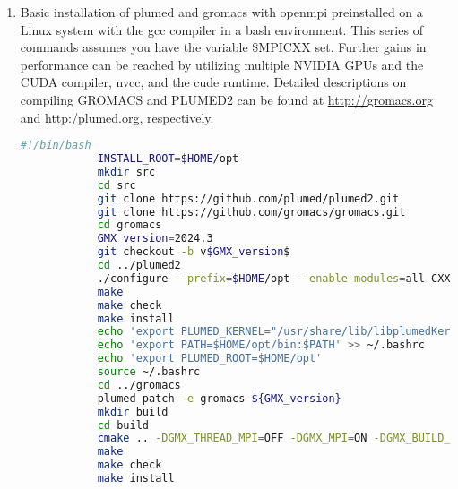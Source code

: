 \begin{enumerate}
\item Basic installation of plumed and gromacs with openmpi preinstalled on a Linux system with the gcc compiler in a bash environment. 
This series of commands assumes you have the variable \$MPICXX set. 
Further gains in performance can be reached by utilizing multiple NVIDIA GPUs and the CUDA compiler, nvcc, and the cude runtime. Detailed descriptions on compiling GROMACS and PLUMED2 can be found at \href{http://gromacs.org}{http://gromacs.org} and \href{http:/plumed.org}{http:/plumed.org}, respectively.\\
    \begin{minipage}[t]{\linewidth}
        \begin{lstlisting}[language=bash,xleftmargin=0mm,autogobble,breaklines=true]
            #!/bin/bash
            INSTALL_ROOT=$HOME/opt
            mkdir src
            cd src
            git clone https://github.com/plumed/plumed2.git
            git clone https://github.com/gromacs/gromacs.git
            cd gromacs
            GMX_version=2024.3
            git checkout -b v$GMX_version$
            cd ../plumed2
            ./configure --prefix=$HOME/opt --enable-modules=all CXX="$MPICXX" CXXFLAGS="-O3 -axSSE2,AVX" 
            make
            make check
            make install
            echo 'export PLUMED_KERNEL="/usr/share/lib/libplumedKernel.so"' >> ~/.bashrc
            echo 'export PATH=$HOME/opt/bin:$PATH' >> ~/.bashrc
            echo 'export PLUMED_ROOT=$HOME/opt'
            source ~/.bashrc
            cd ../gromacs
            plumed patch -e gromacs-${GMX_version}
            mkdir build
            cd build
            cmake .. -DGMX_THREAD_MPI=OFF -DGMX_MPI=ON -DGMX_BUILD_OWN_FFTW=ON -DREGRESSIONTEST_DOWNLOAD=ON -DCMAKE_INSTALL_PREFIX=$HOME/opt
            make 
            make check 
            make install
        \end{lstlisting}
    \end{minipage}\label{notes:installation}
\end{enumerate}